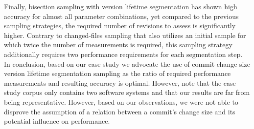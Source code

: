 Finally, bisection sampling with version lifetime segmentation has shown high
accuracy for almost all parameter combinations, yet compared to the previous
sampling strategies, the required number of revisions to assess is
significantly higher. Contrary to changed-files sampling that also utilizes an
initial sample for which twice the number of measurements is required, this
sampling strategy additionally requires two performance requirements for each
segmentation step.\\

In conclusion, based on our case study we advocate the use of commit change
size version lifetime segmentation sampling as the ratio of required performance
measurements and resulting accuracy is optimal. However, note that the case study corpus only contains two
software systems and that our results are far from being representative.
However, based on our observations, we were not able to disprove the assumption
of a relation between a commit’s change size and its potential influence on performance.
